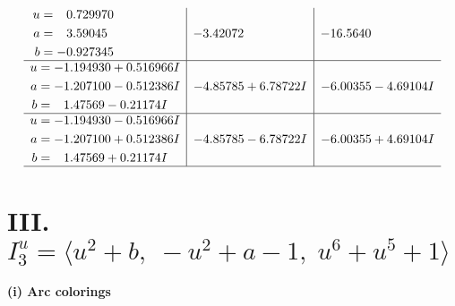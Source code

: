 \documentclass[1p]{elsarticle_modified}
\theoremstyle{definition}
\begin{document}
$$\begin{array}{c|c|c}
\begin{aligned}
u &= \phantom{-}0.729970\phantom{ +0.000000I} \\
a &= \phantom{-}3.59045\phantom{ +0.000000I} \\
b &= -0.927345\phantom{ +0.000000I}\end{aligned}
 & -3.42072\phantom{ +0.000000I} & -16.5640\phantom{ +0.000000I} \\ \hline\begin{aligned}
u &= -1.194930 + 0.516966 I \\
a &= -1.207100 - 0.512386 I \\
b &= \phantom{-}1.47569 - 0.21174 I\end{aligned}
 & -4.85785 + 6.78722 I & -6.00355 - 4.69104 I \\ \hline\begin{aligned}
u &= -1.194930 - 0.516966 I \\
a &= -1.207100 + 0.512386 I \\
b &= \phantom{-}1.47569 + 0.21174 I\end{aligned}
 & -4.85785 - 6.78722 I & -6.00355 + 4.69104 I\\
 \hline 
 \end{array}$$\newpage\newpage\renewcommand{\arraystretch}{1}
\centering \section*{III. $I^u_{3}= \langle u^2+b,\;- u^2+a-1,\;u^6+u^5+1 \rangle$}
\flushleft \textbf{(i) Arc colorings}\\
\end{document}
